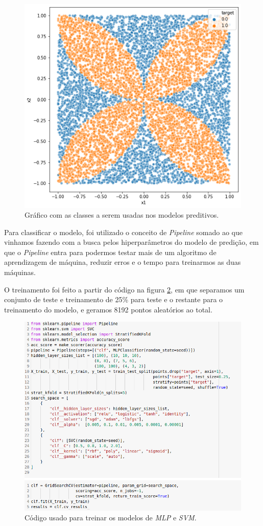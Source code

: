 \documentclass[a4paper, 12pt]{article}
\begin{document}
\begin{figure}[h]
	\centering
	\includegraphics[width=0.8\linewidth]{figuras/quest10_classes.png}
    \caption{Gráfico com as classes a serem usadas nos modelos preditivos.}
    \label{fig:quest10_classes}
\end{figure}
\FloatBarrier

Para classificar o modelo, foi utilizado o conceito de \textit{Pipeline} somado ao que vinhamos fazendo com a busca pelos hiperparâmetros do modelo de predição, em que o \textit{Pipeline} entra para podermos testar mais de um algoritmo de aprendizagem de máquina, reduzir erros e o tempo para treinarmos as duas máquinas.

O treinamento foi feito a partir do código na figura \ref{fig:quest10_code}, em que separamos um conjunto de teste e treinamento de 25\% para teste e o restante para o treinamento do modelo, e geramos 8192 pontos aleatórios ao total.


\begin{figure}[h]
	\centering
	\includegraphics[width=0.8\linewidth]{figuras/quest10_code.png}
    \caption{Código usado para treinar os modelos de \textit{MLP} e \textit{SVM}.}
    \label{fig:quest10_code}
\end{figure}
\FloatBarrier
\end{document}
